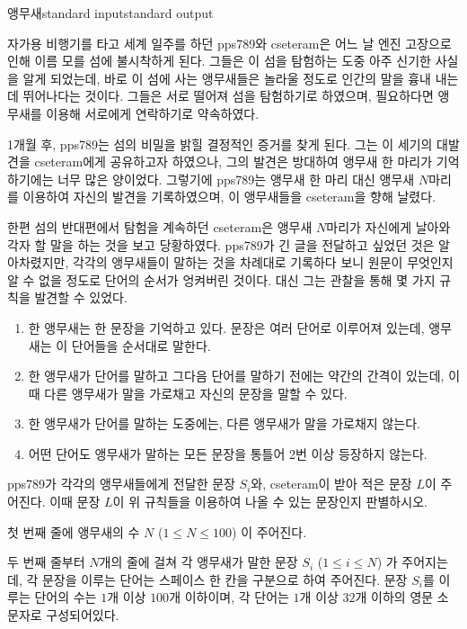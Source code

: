 \begin{problem}{앵무새}{standard input}{standard output}

자가용 비행기를 타고 세계 일주를 하던 pps789와 cseteram은 어느 날 엔진 고장으로 인해 이름 모를 섬에 불시착하게 된다. 그들은 이 섬을 탐험하는 도중 아주 신기한 사실을 알게 되었는데, 바로 이 섬에 사는 앵무새들은 놀라울 정도로 인간의 말을 흉내 내는 데 뛰어나다는 것이다. 그들은 서로 떨어져 섬을 탐험하기로 하였으며, 필요하다면 앵무새를 이용해 서로에게 연락하기로 약속하였다.

1개월 후, pps789는 섬의 비밀을 밝힐 결정적인 증거를 찾게 된다. 그는 이 세기의 대발견을 cseteram에게 공유하고자 하였으나, 그의 발견은 방대하여 앵무새 한 마리가 기억하기에는 너무 많은 양이었다. 그렇기에 pps789는 앵무새 한 마리 대신 앵무새 $N$마리를 이용하여 자신의 발견을 기록하였으며, 이 앵무새들을 cseteram을 향해 날렸다.

한편 섬의 반대편에서 탐험을 계속하던 cseteram은 앵무새 $N$마리가 자신에게 날아와 각자 할 말을 하는 것을 보고 당황하였다. pps789가 긴 글을 전달하고 싶었던 것은 알아차렸지만, 각각의 앵무새들이 말하는 것을 차례대로 기록하다 보니 원문이 무엇인지 알 수 없을 정도로 단어의 순서가 엉켜버린 것이다. 대신 그는 관찰을 통해 몇 가지 규칙을 발견할 수 있었다.

\begin{enumerate}
\item{한 앵무새는 한 문장을 기억하고 있다. 문장은 여러 단어로 이루어져 있는데, 앵무새는 이 단어들을 순서대로 말한다.}
\item{한 앵무새가 단어를 말하고 그다음 단어를 말하기 전에는 약간의 간격이 있는데, 이때 다른 앵무새가 말을 가로채고 자신의 문장을 말할 수 있다.}
\item{한 앵무새가 단어를 말하는 도중에는, 다른 앵무새가 말을 가로채지 않는다.}
\item{어떤 단어도 앵무새가 말하는 모든 문장을 통틀어 2번 이상 등장하지 않는다.}
\end{enumerate}

pps789가 각각의 앵무새들에게 전달한 문장 $S_i$와, cseteram이 받아 적은 문장 $L$이 주어진다. 이때 문장 $L$이 위 규칙들을 이용하여 나올 수 있는 문장인지 판별하시오.

\InputFile
첫 번째 줄에 앵무새의 수 $N$ ($1 \le N \le 100$) 이 주어진다.

두 번째 줄부터 $N$개의 줄에 걸쳐 각 앵무새가 말한 문장 $S_i$ ($1 \le i \le N$) 가 주어지는데, 각 문장을 이루는 단어는 스페이스 한 칸을 구분으로 하여 주어진다. 문장 $S_i$를 이루는 단어의 수는 $1$개 이상 $100$개 이하이며, 각 단어는 $1$개 이상 $32$개 이하의 영문 소문자로 구성되어있다.


\end{problem}
